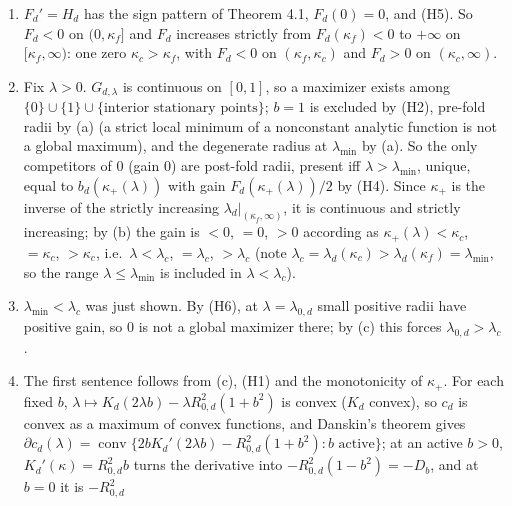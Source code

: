 \documentclass[
  11pt,
  a4paper,
]{article}
\begin{document}
\begin{enumerate}
\def\labelenumi{(\alph{enumi})}
\setcounter{enumi}{1}
\item
  \(F_d'=H_d\) has the sign pattern of Theorem 4.1, \(F_d(0)=0\), and
  (H5). So \(F_d<0\) on \((0,\allowbreak{}\kappa_f]\) and \(F_d\) increases strictly
  from \(F_d(\kappa_f)<0\) to \(+\infty\) on \([\kappa_f,\allowbreak{}\infty)\): one
  zero \(\kappa_c>\kappa_f\), with \(F_d<0\) on \((\kappa_f,\allowbreak{}\kappa_c)\)
  and \(F_d>0\) on \((\kappa_c,\allowbreak{}\infty)\).
\item
  Fix \(\lambda>0\). \(G_{d,\allowbreak{}\lambda}\) is continuous on \([0,\allowbreak{}1]\), so a
  maximizer exists among
  \(\{0\}\cup\{1\}\cup\{\text{interior stationary points}\}\); \(b=1\)
  is excluded by (H2), pre-fold radii by (a) (a strict local minimum of
  a nonconstant analytic function is not a global maximum), and the
  degenerate radius at \(\lambda_{\min}\) by (a). So the only
  competitors of \(0\) (gain \(0\)) are post-fold radii, present iff
  \(\lambda>\lambda_{\min}\), unique, equal to
  \(b_d(\kappa_+(\lambda))\) with gain \(F_d(\kappa_+(\lambda))/2\) by
  (H4). Since \(\kappa_+\) is the inverse of the strictly increasing
  \(\lambda_d|_{(\kappa_f,\allowbreak{}\infty)}\), it is continuous and strictly
  increasing; by (b) the gain is \(<0\), \(=0\), \(>0\) according as
  \(\kappa_+(\lambda)<\kappa_c\), \(=\kappa_c\), \(>\kappa_c\),
  i.e.~\(\lambda<\lambda_c\), \(=\lambda_c\), \(>\lambda_c\) (note
  \(\lambda_c=\lambda_d(\kappa_c)>\lambda_d(\kappa_f)=\lambda_{\min}\),
  so the range \(\lambda\le\lambda_{\min}\) is included in
  \(\lambda<\lambda_c\)).
\item
  \(\lambda_{\min}<\lambda_c\) was just shown. By (H6), at
  \(\lambda=\lambda_{0,\allowbreak{}d}\) small positive radii have positive gain, so
  \(0\) is not a global maximizer there; by (c) this forces
  \(\lambda_{0,\allowbreak{}d}>\lambda_c\).
\item
  The first sentence follows from (c), (H1) and the monotonicity of
  \(\kappa_+\). For each fixed \(b\),
  \(\lambda\mapsto K_d(2\lambda b)-\lambda R_{0,\allowbreak{}d}^2(1+b^2)\) is convex
  (\(K_d\) convex), so \(c_d\) is convex as a maximum of convex
  functions, and Danskin's theorem gives
  \(\partial c_d(\lambda)=\operatorname{conv}\{2bK_d'(2\lambda b)-R_{0,\allowbreak{}d}^2(1+b^2): b\text{ active}\}\);
  at an active \(b>0\), \(K_d'(\kappa)=R_{0,\allowbreak{}d}^2b\) turns the derivative
  into \(-R_{0,\allowbreak{}d}^2(1-b^2)=-D_b\), and at \(b=0\) it is \(-R_{0,\allowbreak{}d}^2\)

\end{enumerate}
\end{document}
